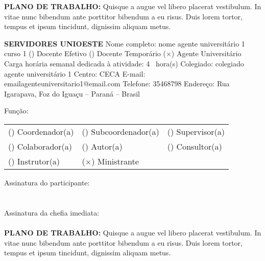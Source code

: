 \documentclass[12pt,a4paper,oneside]{article}%
\begin{document}
\begin{enumerate}
\begin{mdframed}[innertopmargin=5pt, innerleftmargin=3pt, innerrightmargin=3pt]
\textbf{PLANO DE TRABALHO: }%
Quisque a augue vel libero placerat vestibulum. In vitae nunc bibendum ante porttitor bibendum a eu risus. Duis lorem tortor, tempus et ipsum tincidunt, dignissim aliquam metus.%
\end{mdframed}%
\begin{mdframed}[innertopmargin=5pt, innerleftmargin=3pt, innerrightmargin=3pt]%
\textbf{SERVIDORES UNIOESTE }%
\newline%
Nome completo: %
nome agente universitário 1 curso 1%
\newline%
(\phantom{$\times$}) Docente Efetivo %
(\phantom{$\times$}) Docente Temporário %
($\times$) Agente Universitário %
\newline%
Carga horária semanal dedicada à atividade: %
4%
\ hora(s) \hfill%
\newline%
Colegiado: %
colegiado agente universitário 1%
\newline%
Centro: %
CECA%
\newline%
E-mail: %
emailagenteuniversitario1@email.com%
\newline%
Telefone: %
35468798%
\newline%
Endereço: %
Rua Igarapava, Foz do Iguaçu -- Paraná -- Brasil%
\newline%
\begin{mdframed}[innertopmargin=5pt, innerleftmargin=3pt, innerrightmargin=3pt]%
Função: %
\newline%
\begin{tabularx}{\linewidth}{XXX}%
(\phantom{$\times$}) Coordenador(a) &(\phantom{$\times$}) Subcoordenador(a) &(\phantom{$\times$}) Supervisor(a) \\%
(\phantom{$\times$}) Colaborador(a) &(\phantom{$\times$}) Autor(a) &(\phantom{$\times$}) Consultor(a) \\%
(\phantom{$\times$}) Instrutor(a) &($\times$) Ministrante&\\%
\end{tabularx}%
\end{mdframed}%
\bigskip%
\bigskip%
Assinatura do participante: \hrulefill \\ \\ \\%
Assinatura da chefia imediata: \hrulefill \\ \\%
\textbf{PLANO DE TRABALHO: }%
Quisque a augue vel libero placerat vestibulum. In vitae nunc bibendum ante porttitor bibendum a eu risus. Duis lorem tortor, tempus et ipsum tincidunt, dignissim aliquam metus.%
\end{mdframed}%

\end{enumerate}
\end{document}
